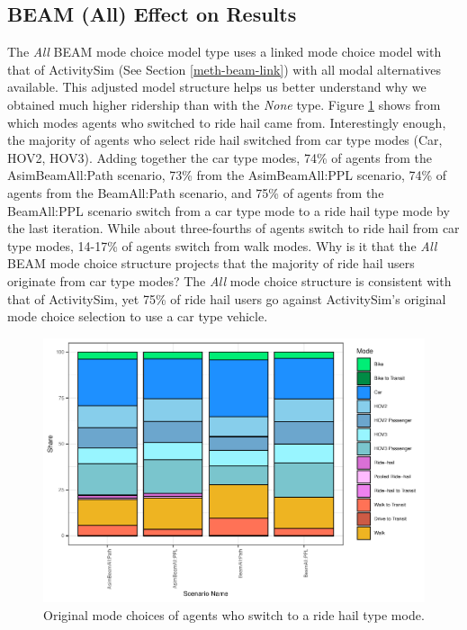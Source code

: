 \documentclass[fancy, masters]{byuthesis}
\begin{document}
\hypertarget{type3}{%
\subsection{BEAM (All) Effect on Results}\label{type3}}

The \emph{All} BEAM mode choice model type uses a linked mode choice model with that of ActivitySim (See Section \ref{meth-beam-link}) with all modal alternatives available. This adjusted model structure helps us better understand why we obtained much higher ridership than with the \emph{None} type. Figure \ref{fig:piechart} shows from which modes agents who switched to ride hail came from. Interestingly enough, the majority of agents who select ride hail switched from car type modes (Car, HOV2, HOV3). Adding together the car type modes, 74\% of agents from the AsimBeamAll:Path scenario, 73\% from the AsimBeamAll:PPL scenario, 74\% of agents from the BeamAll:Path scenario, and 75\% of agents from the BeamAll:PPL scenario switch from a car type mode to a ride hail type mode by the last iteration. While about three-fourths of agents switch to ride hail from car type modes, 14-17\% of agents switch from walk modes. Why is it that the \emph{All} BEAM mode choice structure projects that the majority of ride hail users originate from car type modes? The \emph{All} mode choice structure is consistent with that of ActivitySim, yet 75\% of ride hail users go against ActivitySim's original mode choice selection to use a car type vehicle.

\begin{figure}

{\centering \includegraphics{thesis_files/figure-latex/piechart-1} 

}

\caption{Original mode choices of agents who switch to a ride hail type mode.}\label{fig:piechart}
\end{figure}
\end{document}
